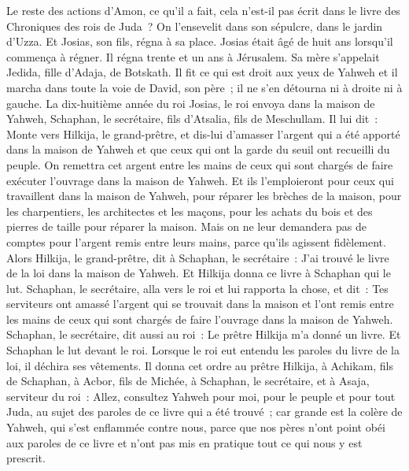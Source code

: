 \begin{multicols}{2}
Le reste des actions d'Amon, ce qu'il a fait, cela n'est-il pas écrit dans le livre des Chroniques des rois de Juda~?
On l'ensevelit dans son sépulcre, dans le jardin d'Uzza. Et Josias, son fils, régna à sa place.
\VerseOne{}Josias était âgé de huit ans lorsqu'il commença à régner. Il régna trente et un ans à Jérusalem. Sa mère s'appelait Jedida, fille d'Adaja, de Botskath.
Il fit ce qui est droit aux yeux de Yahweh et il marcha dans toute la voie de David, son père~; il ne s'en détourna ni à droite ni à gauche.
La dix-huitième année du roi Josias, le roi envoya dans la maison de Yahweh, Schaphan, le secrétaire, fils d'Atsalia, fils de Meschullam.
Il lui dit~: Monte vers Hilkija, le grand-prêtre, et dis-lui d'amasser l'argent qui a été apporté dans la maison de Yahweh et que ceux qui ont la garde du seuil ont recueilli du peuple.
On remettra cet argent entre les mains de ceux qui sont chargés de faire exécuter l'ouvrage dans la maison de Yahweh. Et ils l'emploieront pour ceux qui travaillent dans la maison de Yahweh, pour réparer les brèches de la maison,
pour les charpentiers, les architectes et les maçons, pour les achats du bois et des pierres de taille pour réparer la maison.
Mais on ne leur demandera pas de comptes pour l'argent remis entre leurs mains, parce qu'ils agissent fidèlement.
Alors Hilkija, le grand-prêtre, dit à Schaphan, le secrétaire~: J'ai trouvé le livre de la loi dans la maison de Yahweh. Et Hilkija donna ce livre à Schaphan qui le lut.
Schaphan, le secrétaire, alla vers le roi et lui rapporta la chose, et dit~: Tes serviteurs ont amassé l'argent qui se trouvait dans la maison et l'ont remis entre les mains de ceux qui sont chargés de faire l'ouvrage dans la maison de Yahweh.
Schaphan, le secrétaire, dit aussi au roi~: Le prêtre Hilkija m'a donné un livre. Et Schaphan le lut devant le roi.
Lorsque le roi eut entendu les paroles du livre de la loi, il déchira ses vêtements.
Il donna cet ordre au prêtre Hilkija, à Achikam, fils de Schaphan, à Acbor, fils de Michée, à Schaphan, le secrétaire, et à Asaja, serviteur du roi~:
Allez, consultez Yahweh pour moi, pour le peuple et pour tout Juda, au sujet des paroles de ce livre qui a été trouvé~; car grande est la colère de Yahweh, qui s'est enflammée contre nous, parce que nos pères n'ont point obéi aux paroles de ce livre et n'ont pas mis en pratique tout ce qui nous y est prescrit.

\end{multicols}
